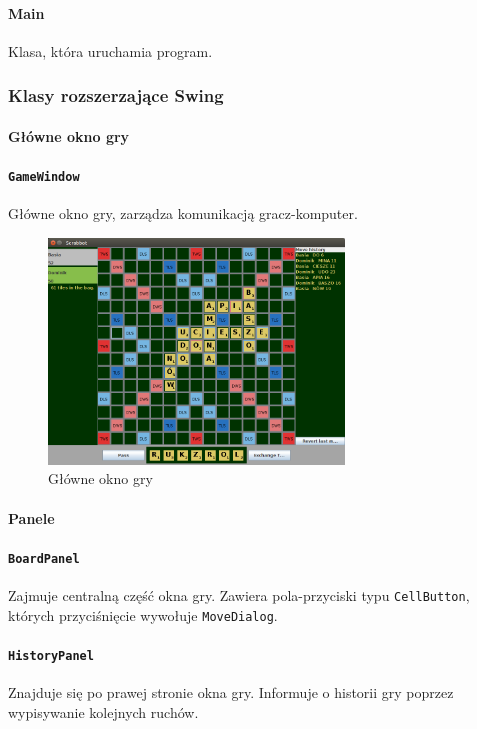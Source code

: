 \documentclass[a4paper]{article}
\begin{document}
\paragraph{Main}
Klasa, która uruchamia program.

\newpage
\subsubsection{Klasy rozszerzające Swing}
\paragraph{Główne okno gry}
\paragraph{\texttt{GameWindow}} Główne okno gry, zarządza komunikacją gracz-komputer.

\begin{figure}[!ht]
\centering
\includegraphics[width=0.7\textwidth]{1.png}
\caption{Główne okno gry}
\end{figure}
\paragraph{Panele}
\paragraph{\texttt{BoardPanel}} Zajmuje centralną część okna gry. Zawiera pola-przyciski typu \texttt{CellButton}, których przyciśnięcie wywołuje \texttt{MoveDialog}.
\paragraph{\texttt{HistoryPanel}} Znajduje się po prawej stronie okna gry. Informuje o historii gry poprzez wypisywanie kolejnych ruchów.
\end{document}
